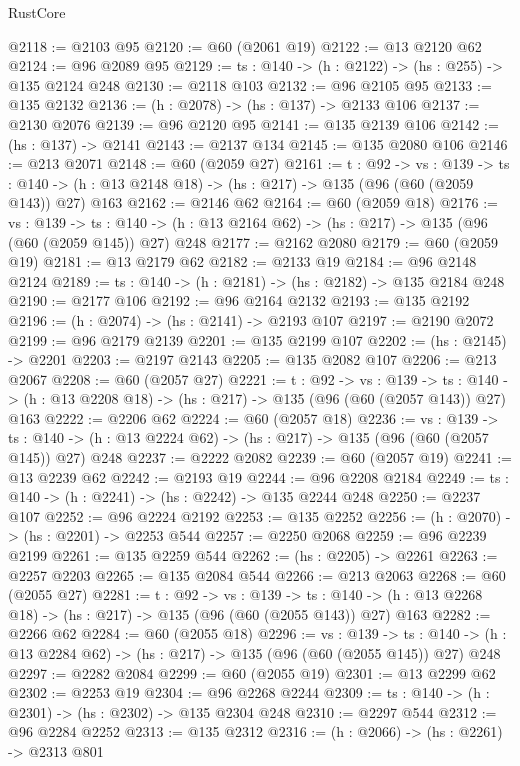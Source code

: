 \begin{lexlean}{RustCore}
\begin{coremodule}
@2118 := @2103 @95
@2120 := @60 (@2061 @19)
@2122 := @13 @2120 @62
@2124 := @96 @2089 @95
@2129 := {ts : @140} -> (h : @2122) -> (hs : @255) -> @135 @2124 @248
@2130 := @2118 @103
@2132 := @96 @2105 @95
@2133 := @135 @2132
@2136 := (h : @2078) -> (hs : @137) -> @2133 @106
@2137 := @2130 @2076
@2139 := @96 @2120 @95
@2141 := @135 @2139 @106
@2142 := (hs : @137) -> @2141
@2143 := @2137 @134
@2145 := @135 @2080 @106
@2146 := @213 @2071
@2148 := @60 (@2059 @27)
@2161 := {t : @92} ->
  {vs : @139} ->
  {ts : @140} -> (h : @13 @2148 @18) -> (hs : @217) -> @135 (@96 (@60 (@2059 @143)) @27) @163
@2162 := @2146 @62
@2164 := @60 (@2059 @18)
@2176 := {vs : @139} ->
  {ts : @140} -> (h : @13 @2164 @62) -> (hs : @217) -> @135 (@96 (@60 (@2059 @145)) @27) @248
@2177 := @2162 @2080
@2179 := @60 (@2059 @19)
@2181 := @13 @2179 @62
@2182 := @2133 @19
@2184 := @96 @2148 @2124
@2189 := {ts : @140} -> (h : @2181) -> (hs : @2182) -> @135 @2184 @248
@2190 := @2177 @106
@2192 := @96 @2164 @2132
@2193 := @135 @2192
@2196 := (h : @2074) -> (hs : @2141) -> @2193 @107
@2197 := @2190 @2072
@2199 := @96 @2179 @2139
@2201 := @135 @2199 @107
@2202 := (hs : @2145) -> @2201
@2203 := @2197 @2143
@2205 := @135 @2082 @107
@2206 := @213 @2067
@2208 := @60 (@2057 @27)
@2221 := {t : @92} ->
  {vs : @139} ->
  {ts : @140} -> (h : @13 @2208 @18) -> (hs : @217) -> @135 (@96 (@60 (@2057 @143)) @27) @163
@2222 := @2206 @62
@2224 := @60 (@2057 @18)
@2236 := {vs : @139} ->
  {ts : @140} -> (h : @13 @2224 @62) -> (hs : @217) -> @135 (@96 (@60 (@2057 @145)) @27) @248
@2237 := @2222 @2082
@2239 := @60 (@2057 @19)
@2241 := @13 @2239 @62
@2242 := @2193 @19
@2244 := @96 @2208 @2184
@2249 := {ts : @140} -> (h : @2241) -> (hs : @2242) -> @135 @2244 @248
@2250 := @2237 @107
@2252 := @96 @2224 @2192
@2253 := @135 @2252
@2256 := (h : @2070) -> (hs : @2201) -> @2253 @544
@2257 := @2250 @2068
@2259 := @96 @2239 @2199
@2261 := @135 @2259 @544
@2262 := (hs : @2205) -> @2261
@2263 := @2257 @2203
@2265 := @135 @2084 @544
@2266 := @213 @2063
@2268 := @60 (@2055 @27)
@2281 := {t : @92} ->
  {vs : @139} ->
  {ts : @140} -> (h : @13 @2268 @18) -> (hs : @217) -> @135 (@96 (@60 (@2055 @143)) @27) @163
@2282 := @2266 @62
@2284 := @60 (@2055 @18)
@2296 := {vs : @139} ->
  {ts : @140} -> (h : @13 @2284 @62) -> (hs : @217) -> @135 (@96 (@60 (@2055 @145)) @27) @248
@2297 := @2282 @2084
@2299 := @60 (@2055 @19)
@2301 := @13 @2299 @62
@2302 := @2253 @19
@2304 := @96 @2268 @2244
@2309 := {ts : @140} -> (h : @2301) -> (hs : @2302) -> @135 @2304 @248
@2310 := @2297 @544
@2312 := @96 @2284 @2252
@2313 := @135 @2312
@2316 := (h : @2066) -> (hs : @2261) -> @2313 @801

\end{coremodule}
\end{lexlean}
